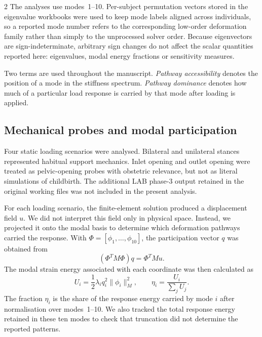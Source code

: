 \documentclass[openacc]{rsproca_new}
\begin{document}
\begin{multicols}{2}
The analyses use modes~1--10. Per-subject permutation vectors stored in the eigenvalue workbooks were used to keep mode labels aligned across individuals, so a reported mode number refers to the corresponding low-order deformation family rather than simply to the unprocessed solver order. Because eigenvectors are sign-indeterminate, arbitrary sign changes do not affect the scalar quantities reported here: eigenvalues, modal energy fractions or sensitivity measures.

Two terms are used throughout the manuscript. \emph{Pathway accessibility} denotes the position of a mode in the stiffness spectrum. \emph{Pathway dominance} denotes how much of a particular load response is carried by that mode after loading is applied.


\subsection{Mechanical probes and modal participation}

Four static loading scenarios were analysed. Bilateral and unilateral stances represented habitual support mechanics. Inlet opening and outlet opening were treated as pelvic-opening probes with obstetric relevance, but not as literal simulations of childbirth. The additional LAB phase-3 output retained in the original working files was not included in the present analysis.

For each loading scenario, the finite-element solution produced a displacement field $u$. We did not interpret this field only in physical space. Instead, we projected it onto the modal basis to determine which deformation pathways carried the response. With $\Phi=[\phi_{1},\ldots,\phi_{10}]$, the participation vector $q$ was obtained from
\begin{equation}
(\Phi^{T}M\Phi)q = \Phi^{T}Mu.
\end{equation}
The modal strain energy associated with each coordinate was then calculated as
\begin{equation}
U_{i}=\frac{1}{2}\lambda_{i}q_{i}^{2}\lVert\phi_{i}\rVert_{M}^{2}, \qquad
\eta_{i}=\frac{U_{i}}{\sum_{j}U_{j}}.
\end{equation}
The fraction $\eta_i$ is the share of the response energy carried by mode $i$ after normalisation over modes~1--10. We also tracked the total response energy retained in these ten modes to check that truncation did not determine the reported patterns.


\end{multicols}
\end{document}
